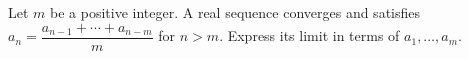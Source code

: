 Let $m$ be a positive integer. A real sequence converges and satisfies $a_n=\dfrac{a_{n-1}+\cdots+a_{n-m}}{m}$ for $n>m$. Express its limit in terms of $a_1,\ldots,a_m$.
